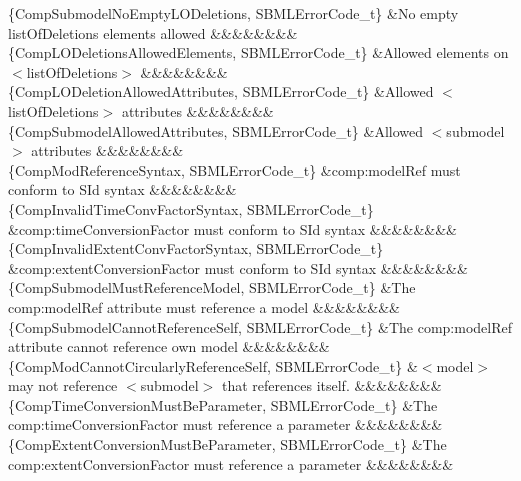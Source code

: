 \begin{DoxyParagraph}{}
\begin{longtabu}
\{Comp\+Submodel\+No\+Empty\+L\+O\+Deletions, S\+B\+M\+L\+Error\+Code\+\_\+t\} &No empty list\+Of\+Deletions elements allowed &&&&&&&&\\
\{Comp\+L\+O\+Deletions\+Allowed\+Elements, S\+B\+M\+L\+Error\+Code\+\_\+t\} &Allowed elements on {\ttfamily $<$list\+Of\+Deletions$>$} &&&&&&&&\\
\{Comp\+L\+O\+Deletion\+Allowed\+Attributes, S\+B\+M\+L\+Error\+Code\+\_\+t\} &Allowed {\ttfamily $<$list\+Of\+Deletions$>$} attributes &&&&&&&&\\
\{Comp\+Submodel\+Allowed\+Attributes, S\+B\+M\+L\+Error\+Code\+\_\+t\} &Allowed {\ttfamily $<$submodel$>$} attributes &&&&&&&&\\
\{Comp\+Mod\+Reference\+Syntax, S\+B\+M\+L\+Error\+Code\+\_\+t\} &\textquotesingle{}comp\+:model\+Ref\textquotesingle{} must conform to S\+Id syntax &&&&&&&&\\
\{Comp\+Invalid\+Time\+Conv\+Factor\+Syntax, S\+B\+M\+L\+Error\+Code\+\_\+t\} &\textquotesingle{}comp\+:time\+Conversion\+Factor\textquotesingle{} must conform to S\+Id syntax &&&&&&&&\\
\{Comp\+Invalid\+Extent\+Conv\+Factor\+Syntax, S\+B\+M\+L\+Error\+Code\+\_\+t\} &\textquotesingle{}comp\+:extent\+Conversion\+Factor\textquotesingle{} must conform to S\+Id syntax &&&&&&&&\\
\{Comp\+Submodel\+Must\+Reference\+Model, S\+B\+M\+L\+Error\+Code\+\_\+t\} &The \textquotesingle{}comp\+:model\+Ref\textquotesingle{} attribute must reference a model &&&&&&&&\\
\{Comp\+Submodel\+Cannot\+Reference\+Self, S\+B\+M\+L\+Error\+Code\+\_\+t\} &The \textquotesingle{}comp\+:model\+Ref\textquotesingle{} attribute cannot reference own model &&&&&&&&\\
\{Comp\+Mod\+Cannot\+Circularly\+Reference\+Self, S\+B\+M\+L\+Error\+Code\+\_\+t\} &{\ttfamily $<$model$>$} may not reference {\ttfamily $<$submodel$>$} that references itself. &&&&&&&&\\
\{Comp\+Time\+Conversion\+Must\+Be\+Parameter, S\+B\+M\+L\+Error\+Code\+\_\+t\} &The \textquotesingle{}comp\+:time\+Conversion\+Factor\textquotesingle{} must reference a parameter &&&&&&&&\\
\{Comp\+Extent\+Conversion\+Must\+Be\+Parameter, S\+B\+M\+L\+Error\+Code\+\_\+t\} &The \textquotesingle{}comp\+:extent\+Conversion\+Factor\textquotesingle{} must reference a parameter &&&&&&&&\\

\end{longtabu}
\end{DoxyParagraph}
